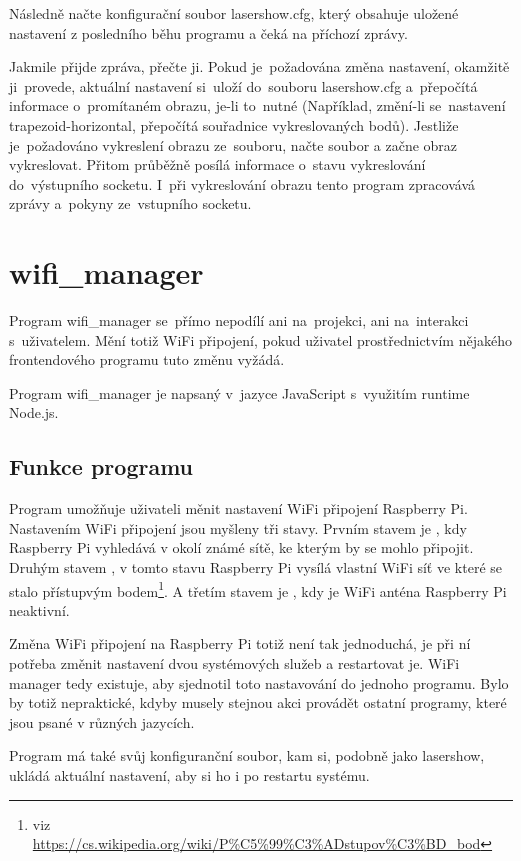 Následně načte konfigurační soubor lasershow.cfg, který obsahuje uložené nastavení z posledního běhu programu a čeká na příchozí zprávy.

Jakmile přijde zpráva, přečte ji. Pokud je~požadována změna nastavení, okamžitě ji~provede, aktuální nastavení si~uloží do~souboru lasershow.cfg a~přepočítá informace o~promítaném obrazu, je-li to~nutné (Například, změní-li se~nastavení trapezoid-horizontal, přepočítá souřadnice vykreslovaných bodů).
Jestliže je~požadováno vykreslení obrazu ze~souboru, načte soubor a začne obraz vykreslovat.
Přitom průběžně posílá informace o~stavu vykreslování do~výstupního socketu.
I~při vykreslování obrazu tento program zpracovává zprávy a~pokyny ze~vstupního socketu.

\section{wifi\_manager}

Program wifi\_manager se~přímo nepodílí ani na~projekci, ani na~interakci s~uživatelem. Mění totiž WiFi připojení, pokud uživatel prostřednictvím nějakého frontendového programu tuto změnu vyžádá.

Program wifi\_manager je napsaný v~jazyce JavaScript s~využitím runtime Node.js.

\subsection{Funkce programu}
Program umožňuje uživateli měnit nastavení WiFi připojení Raspberry Pi. Nastavením WiFi připojení jsou myšleny tři stavy.
Prvním stavem je , kdy Raspberry Pi vyhledává v okolí známé sítě, ke kterým by se mohlo připojit.
Druhým stavem , v tomto stavu Raspberry Pi vysílá vlastní WiFi síť ve které se stalo přístupvým bodem\footnote{viz \url{https://cs.wikipedia.org/wiki/P\%C5\%99\%C3\%ADstupov\%C3\%BD\_bod}}.
A třetím stavem je , kdy je WiFi anténa Raspberry Pi neaktivní.

Změna WiFi připojení na Raspberry Pi totiž není tak jednoduchá, je při ní potřeba změnit nastavení dvou systémových služeb a restartovat je.
WiFi manager tedy existuje, aby sjednotil toto nastavování do jednoho programu. Bylo by totiž nepraktické, kdyby musely stejnou akci provádět ostatní programy, které jsou psané v různých jazycích.

Program má také svůj konfiguranční soubor, kam si, podobně jako lasershow, ukládá aktuální nastavení, aby si ho  i po restartu systému.

